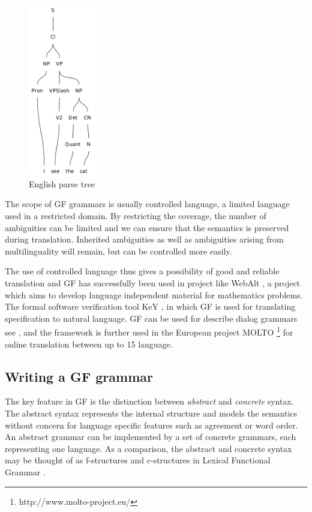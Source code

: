 \documentclass{report}
\begin{document}
\newpage
\begin{figure}
\includegraphics[width=30mm]{gfETree.png}
\caption{English parse tree}
\label{pic:gfEtree}
\end{figure}


The scope of GF grammars is usually controlled language, a limited language used in
a restricted domain. By
restricting the coverage, the number of ambiguities
can be limited and we can ensure that the semantics is preserved during
translation. Inherited ambiguities as well as ambiguities arising from multilinguality will
remain, but can be controlled more easily. %

The use of controlled language thus gives a possibility of good and reliable translation
and GF has successfully been used in project like %
WebAlt \cite{webalt}, a project which aims to develop language independent
material for mathematics problems. The formal software verification tool
KeY \cite{key}, in which GF is used for translating specification to natural language.
GF can be used for describe dialog grammars see \cite{talk}, and
the framework is further used in the
European project MOLTO \footnote{http://www.molto-project.eu/} for online
translation between up to 15 language.\\

\vspace{10mm}
\subsection{Writing a GF grammar}
\label{sec:writegf}
The key feature in GF is the distinction between
\textit{abstract} and \textit{concrete} syntax. The abstract syntax represents
the internal structure and models the semantics without concern for language
specific features such as agreement or word order.
An abstract grammar can be implemented by a set of concrete grammars, each
representing one language. As a comparison, the abstract and concrete syntax
may be thought of as f-structures and c-structures in Lexical Functional
Grammar \cite{lfg}.
\end{document}
